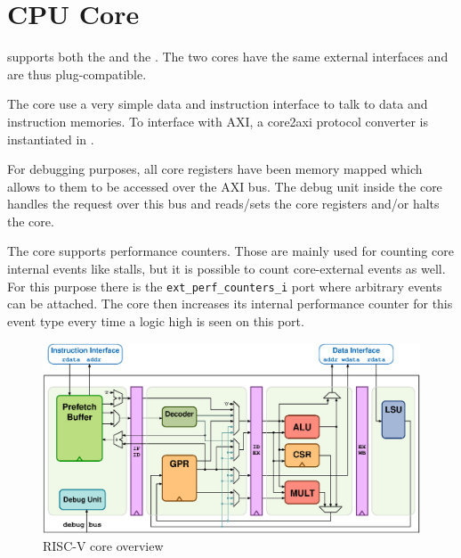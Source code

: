\chapter{CPU Core}

\pulpino supports both the \riscv \rvcore and the \riscv \zerocore. The two
cores have the same external interfaces and are thus plug-compatible.

The core use a very simple data and instruction interface to talk to data and
instruction memories. To interface with AXI, a core2axi protocol converter is
instantiated in \pulpino.

For debugging purposes, all core registers have been memory mapped which allows
to them to be accessed over the AXI bus. The debug unit inside the core handles
the request over this bus and reads/sets the core registers and/or halts the core.

The core supports performance counters. Those are mainly used for counting core
internal events like stalls, but it is possible to count core-external events
as well. For this purpose there is the \texttt{ext\_perf\_counters\_i} port where
arbitrary events can be attached. The core then increases its internal
performance counter for this event type every time a logic high is seen on this
port.

\begin{figure}[ht]
  \centering
  \includegraphics[width=\textwidth]{./figures/riscv_overview.eps}
  \caption{RISC-V core overview}
  \label{fig1}
\end{figure}
